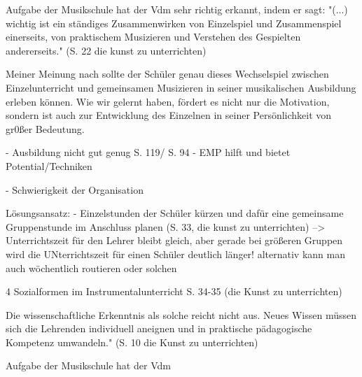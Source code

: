 
Aufgabe der Musikschule hat der Vdm sehr richtig erkannt, indem er sagt: "(...)
wichtig ist ein ständiges Zusammenwirken von Einzelspiel und Zusammenspiel
einerseits, von praktischem Musizieren und Verstehen des Gespielten
andererseits." (S. 22 die kunst zu unterrichten)

Meiner Meinung nach sollte der Schüler genau dieses Wechselspiel zwischen
Einzelunterricht und gemeinsamen Musizieren in seiner musikalischen Ausbildung
erleben können. Wie wir gelernt haben, fördert es nicht nur die Motivation,
sondern ist auch zur Entwicklung des Einzelnen in seiner Persönlichkeit von
gr0ßer Bedeutung. 


- Ausbildung nicht gut genug S. 119/ S. 94
- EMP hilft und bietet Potential/Techniken

- Schwierigkeit der Organisation

Lösungsansatz:
- Einzelstunden der Schüler kürzen und dafür eine gemeinsame Gruppenstunde im
Anschluss planen (S. 33, die kunst zu unterrichten)
--> Unterrichtszeit für den Lehrer bleibt gleich, aber gerade bei größeren
Gruppen wird die UNterrichtszeit für einen Schüler deutlich länger!
    alternativ kann man auch wöchentlich routieren oder solchen


4 Sozialformen im Instrumentalunterricht S. 34-35    (die Kunst zu unterrichten)

Die wissenschaftliche Erkenntnis als solche reicht nicht aus. Neues Wissen
müssen sich die Lehrenden individuell aneignen und in praktische pädagogische
Kompetenz umwandeln." (S. 10 die Kunst zu unterrichten)

Aufgabe der Musikschule hat der Vdm 
